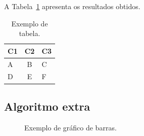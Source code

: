 \documentclass[a4paper,12pt]{article}
\begin{document}
\lipsum[4]

A Tabela~\ref{tab:exemplo} apresenta os resultados obtidos.

\begin{table}[h]
    \centering
    \caption{Exemplo de tabela.}
    \label{tab:exemplo}  
    \begin{tabular}{|l||c|p{4cm}|}
       \hline
       \textbf{C1} & \textbf{C2} & \textbf{C3} \\ \hline \hline
        A          & B           & C           \\ \hline
        D          & E           & F           \\ \hline
   \end{tabular} 
\end{table}



\subsection{Algoritmo extra}
\label{sec:algo-extra}

\lipsum[4]

\begin{figure}[ht]
    \centering


    \caption{Exemplo de gráfico de barras.}
    \label{fig:grafico-barras-2}
\end{figure}
\end{document}
